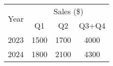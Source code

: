 \newenvironment{fancyTable}{
  \begingroup
  \begin{center}
  \renewcommand{\arraystretch}{1.5}
}{
  \end{center}
  \endgroup
}

\begin{fancyTable}
\begin{tabular}{|c|c|c|c|}
\hline
\multirow{2}{*}{Year} & \multicolumn{3}{c|}{Sales (\$)} \\
\cline{2-4}
 & Q1 & Q2 & Q3+Q4 \\
\hline
2023 & 1500 & 1700 & 4000 \\
2024 & 1800 & 2100 & 4300 \\
\hline
\end{tabular}
\end{fancyTable}
